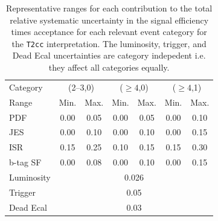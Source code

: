 \begin{table}[h!]
  \caption{Representative ranges for each contribution to the total
    relative systematic uncertainty in the signal efficiency times acceptance
    for each relevant event category for the \texttt{T2cc}
    interpretation. The luminosity, trigger, and Dead Ecal uncertainties
    are category indepedent i.e. they affect all categories equally. 
    \label{tab:sms-syst-t2cc}
  }   
  \centering
  \begin{tabular}{ lcccccc }
    \hline
    \hline
    Category   & \multicolumn{2}{c}{(2--3,0)} & \multicolumn{2}{c}{($\geq 4$,0)} & \multicolumn{2}{c}{($\geq 4$,1)}\\%
    Range      & Min.   & Max.                & Min.   & Max.                    & Min. & Max.                    \\ %
    \hline                                                                                                         %
    PDF        & 0.00   & 0.05                & 0.00   & 0.05                    & 0.00 & 0.10                    \\ %
    JES        & 0.00   & 0.10                & 0.00   & 0.10                    & 0.00 & 0.15 	                  \\ %
    ISR        & 0.15   & 0.25                & 0.10   & 0.15                    & 0.15 & 0.30 	                  \\ %
    b-tag SF   & 0.00   & 0.08                & 0.00   & 0.10                    & 0.00 & 0.15 	                  \\ %
    \hline                                                                                                         %
    Luminosity & \multicolumn{6}{c}{0.026}                                                                      \\ %
    Trigger & \multicolumn{6}{c}{0.05}                                                                       \\ %
    Dead Ecal & \multicolumn{6}{c}{0.03}                                                                       \\ %

\end{tabular}
\end{table}
